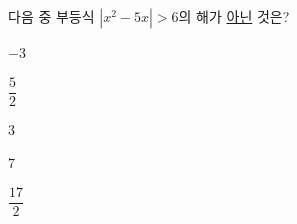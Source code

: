 다음 중 부등식 $|x^2-5x|>6$의 해가 \underline{아닌} 것은?
\begin{choices32}{\rule[-3ex]{0pt}{8ex}$-3$}{\rule[-3ex]{0pt}{8ex}$\dfrac{5}{2}$}{\rule[-3ex]{0pt}{8ex}$3$}{\rule[-3ex]{0pt}{8ex}$7$}{\rule[-3ex]{0pt}{8ex}$\dfrac{17}{2}$}\end{choices32}

